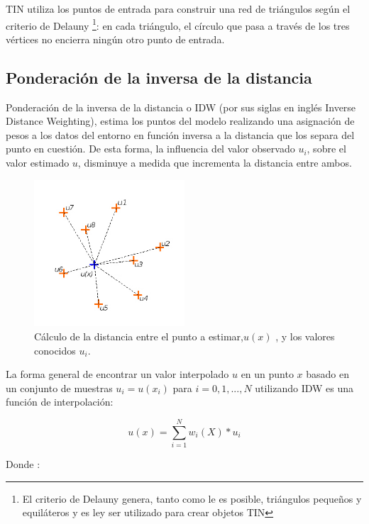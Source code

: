 TIN utiliza los puntos de entrada para construir una red de triángulos según el criterio de Delauny
\footnote{El criterio de Delauny genera, tanto como le es posible, triángulos pequeños y
equiláteros y es ley ser utilizado para crear objetos TIN}: en cada triángulo, el círculo que pasa
a través de los tres vértices no encierra ningún otro punto de entrada\cite{cPachecoMDE2003}.

\subsection{Ponderación de la inversa de la distancia}
Ponderación de la inversa de la distancia o IDW (por sus siglas en inglés Inverse Distance
Weighting), estima los puntos del modelo realizando una asignación de pesos a los datos del
entorno en función inversa a la distancia que los separa del punto en cuestión. De esta forma,
la influencia del valor observado $u_{i}$, sobre el valor estimado $u$, disminuye a medida que
incrementa la distancia entre ambos.


\begin{figure}[!htbp]
\centering
\includegraphics[width=0.5\textwidth]{capitulo-2/graphics/idw-distancia.jpg}
\caption{\label{fig:sig-idw-distancia} Cálculo de la distancia entre el punto a estimar,$u(x)$ , y los valores conocidos $u_{i}$.}

\end{figure}

La forma general de encontrar un valor interpolado $u$ en un punto $x$ basado en un conjunto de
muestras $u_i = u (x_i)$ para $i = 0,1, ..., N$ utilizando IDW es una función de interpolación:

\begin{equation}\label{eq:interpolacion-idw}
 u(x) = \sum_{i=1}^{N} w_i(X) * u_{i}
\end{equation}

Donde :


